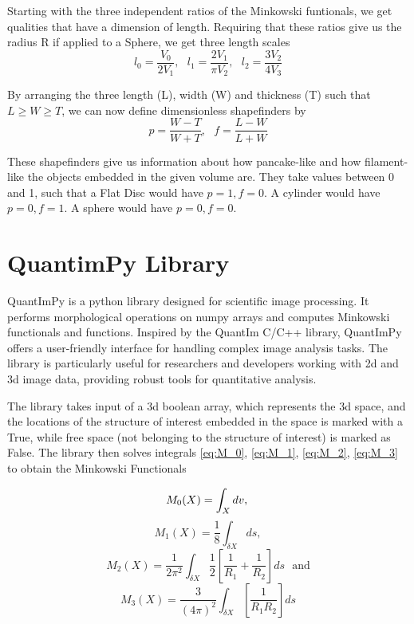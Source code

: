 \documentclass{article}
\begin{document}
Starting with the three independent ratios of the Minkowski funtionals, we get qualities that have a dimension of length. Requiring that these ratios give us the radius R if applied to a Sphere, we get three length scales
\begin{equation}
    l_0 = \frac {V_0}{2V_1}, \: \:\:
    l_1 = \frac {2 V_1}{\pi V_2}, \:\:\:
    l_2 = \frac {3 V_2}{4 V_3}
\end{equation}

By arranging the three length (L), width (W) and thickness (T) such that $L \ge W \ge T$, we can now define dimensionless shapefinders by 
\begin{equation}
    p = \frac {W - T}{W + T}, \: \: \:
    f = \frac {L - W}{L + W}
\end{equation}

These shapefinders give us information about how pancake-like and how filament-like the objects embedded in the given volume are. They take values between 0 and 1, such that a Flat Disc would have $p = 1, f = 0$. A cylinder would have $p = 0, f = 1$. A sphere would have $p = 0, f = 0$. 

\section{QuantimPy Library}
QuantImPy is a python library designed for scientific image processing. It performs morphological operations on numpy arrays and computes Minkowski functionals and functions. Inspired by the QuantIm C/C++ library, QuantImPy offers a user-friendly interface for handling complex image analysis tasks. The library is particularly useful for researchers and developers working with 2d and 3d image data, providing robust tools for quantitative analysis. \cite{boelens2021quantimpy}

The library takes input of a 3d boolean array, which represents the 3d space, and the locations of the structure of interest embedded in the space is marked with a True, while free space (not belonging to the structure of interest) is marked as False. The library then solves integrals \ref{eq:M_0}, \ref{eq:M_1}, \ref{eq:M_2}, \ref{eq:M_3} to obtain the Minkowski Functionals \cite{quantimpy_minkowski}

\begin{equation}
    M_0(X) = \int_X dv, \\
    \label{eq:M_0}
\end{equation}
\begin{equation}
    M_1(X) = \frac{1}{8} \int_{\delta X} ds,
    \label{eq:M_1}
\end{equation}
\begin{equation}
    M_2(X) = \frac{1}{2\pi^2} \int_{\delta X} \frac{1}{2} \left[ \frac{1}{R_1} + \frac{1}{R_2} \right] ds \:\:\: \text{and}
    \label{eq:M_2}
\end{equation}
\begin{equation}
    M_3(X) = \frac{3}{(4\pi)^2} \int_{\delta X} \left[ \frac{1}{R_1 R_2} \right] ds
    \label{eq:M_3}
\end{equation}
\end{document}
